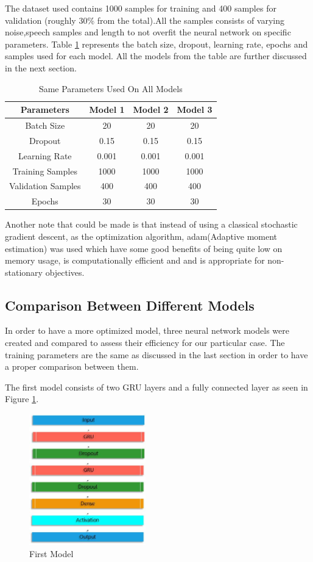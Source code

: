 The dataset used contains 1000 samples for training and 400 samples for validation (roughly 30\% from the total).All the samples consists of varying noise,speech samples and length to not overfit the neural network on specific parameters.
\newpage
Table \ref{tab:firsttable} represents the batch size, dropout, learning rate, epochs and samples used for each model.
All the models from the table are further discussed in the next section.

\begin{table}[htp]
\centering
\begin{tabular}{|c|c|c|c|}
\hline
Parameters         & Model 1 & Model 2 & Model 3 \\ \hline
Batch Size         & 20      & 20      & 20      \\ \hline
Dropout            & 0.15    & 0.15    & 0.15    \\ \hline
Learning Rate      & 0.001   & 0.001   & 0.001   \\ \hline
Training Samples   & 1000    & 1000    & 1000    \\ \hline
Validation Samples & 400     & 400     & 400     \\ \hline
Epochs             & 30      & 30      & 30      \\ \hline
\end{tabular}
\caption{Same Parameters Used On All Models}
\label{tab:firsttable}
\end{table}
Another note that could be made is that instead of using a classical stochastic gradient descent, as the optimization algorithm, adam(Adaptive moment estimation) was used which have some good benefits of being quite low on memory usage, is computationally efficient and and is appropriate for non-stationary objectives.
\newpage
\subsection{Comparison Between Different Models}
In order to have a more optimized model, three neural network models were created and compared to assess their efficiency for our particular case. The training parameters are the same as discussed  in the last section in order to have a proper comparison between them.


The first model consists of two GRU layers and a fully connected layer as seen in Figure \ref{fig:firstModel}.
\begin{figure}[htp]
	\centering
	\includegraphics[width=0.45\textwidth]{Illustrations/Model1.jpg}
	\caption{First Model}
	\label{fig:firstModel}
\end{figure}

